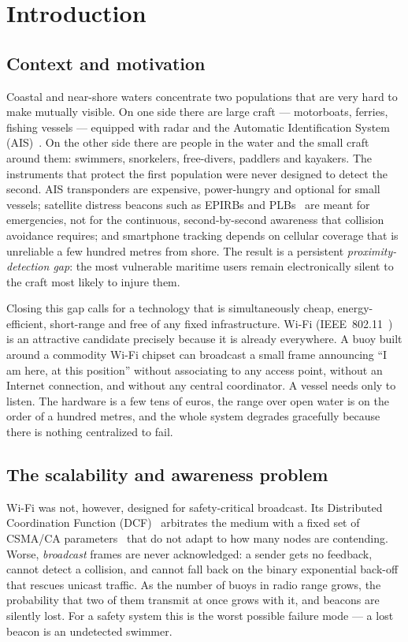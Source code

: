 \documentclass[12pt,a4paper,oneside]{report}
\begin{document}
\chapter{Introduction}
\label{ch:intro}

\section{Context and motivation}
Coastal and near-shore waters concentrate two populations that are very hard to
make mutually visible. On one side there are large craft --- motorboats, ferries,
fishing vessels --- equipped with radar and the Automatic Identification System
(AIS)~\cite{imo-ais}. On the other side there are people in the water and the
small craft around them: swimmers, snorkelers, free-divers, paddlers and
kayakers. The instruments that protect the first population were never designed
to detect the second. AIS transponders are expensive, power-hungry and
optional for small vessels; satellite distress beacons such as EPIRBs and
PLBs~\cite{noaa-beacons} are meant for emergencies, not for the continuous,
second-by-second awareness that collision avoidance requires; and smartphone
tracking depends on cellular coverage that is unreliable a few hundred metres
from shore. The result is a persistent \emph{proximity-detection gap}: the most
vulnerable maritime users remain electronically silent to the craft most likely
to injure them.

Closing this gap calls for a technology that is simultaneously cheap,
energy-efficient, short-range and free of any fixed infrastructure. Wi-Fi
(IEEE~802.11~\cite{ieee80211}) is an attractive candidate precisely because it
is already everywhere. A buoy built around a commodity Wi-Fi chipset can
broadcast a small frame announcing ``I am here, at this position'' without
associating to any access point, without an Internet connection, and without
any central coordinator. A vessel needs only to listen. The hardware is a few
tens of euros, the range over open water is on the order of a hundred metres,
and the whole system degrades gracefully because there is nothing centralized
to fail.

\section{The scalability and awareness problem}
Wi-Fi was not, however, designed for safety-critical broadcast. Its Distributed
Coordination Function (DCF)~\cite{sharetechnote-dcf} arbitrates the medium with
a fixed set of CSMA/CA parameters~\cite{csma-ca} that do not adapt to how many
nodes are contending. Worse, \emph{broadcast} frames are never acknowledged: a
sender gets no feedback, cannot detect a collision, and cannot fall back on the
binary exponential back-off that rescues unicast traffic. As the number of
buoys in radio range grows, the probability that two of them transmit at once
grows with it, and beacons are silently lost. For a safety system this is the
worst possible failure mode --- a lost beacon is an undetected swimmer.
\end{document}
